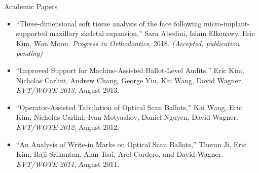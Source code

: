 \documentclass{resume}
\begin{document}
\vspace{-0.75em}

\begin{component}{Academic Papers}
\vspace{-0.25em}
\begin{itemize}
\item[] ``Three-dimensional soft tissue analysis of the face following micro-implant-supported maxillary skeletal expansion,'' Sara Abedini, Islam Elkenawy, Eric Kim, Won Moon. \emph{Progress in Orthodontics}, 2018. \emph{(Accepted, publication pending)}
  \vspace{-0.5em}
        \item[] ``Improved Support for Machine-Assisted Ballot-Level Audits,'' Eric Kim, Nicholas Carlini, Andrew Chang, George Yiu, Kai Wang, David Wagner. \emph{EVT/WOTE 2013}, August 2013.
\vspace{-0.5em}
        \item[] ``Operator-Assisted Tabulation of Optical Scan Ballots,'' Kai Wang, Eric Kim, Nicholas Carlini, Ivan Motyashov, Daniel Nguyen, David Wagner. \emph{EVT/WOTE 2012}, August 2012.
\vspace{-0.5em}
		\item[] ``An Analysis of Write-in Marks on Optical Scan Ballots,'' Theron Ji, Eric Kim, Raji Srikantan, Alan Tsai, Arel Cordero, and David Wagner. \emph{EVT/WOTE 2011}, August 2011.
\vspace{-0.5em}
	\end{itemize}
\end{component}


\end{document}
